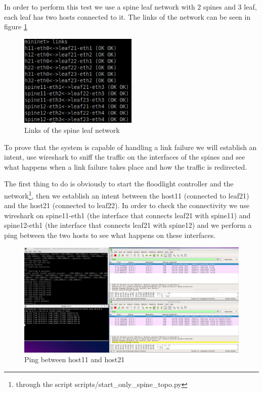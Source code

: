 \noindent In order to perform this test we use a spine leaf network with 2 spines and 3 leaf, each leaf has two hosts connected to it. The links of the network can be seen in figure \ref{img:links}

\begin{figure}[h]
	\centering
	\includegraphics[width=0.50\textwidth]{img/links.png}
	\caption{Links of the spine leaf network}
	\label{img:links}
\end{figure}

\noindent To prove that the system is capable of handling a link failure we will establish an intent, use wireshark to sniff the traffic on the interfaces of the spines and see what happens when a link failure takes place and how the traffic is redirected.

\noindent The first thing to do is obviously to start the floodlight controller and the network\footnote{through the script scripts/start\_only\_spine\_topo.py}, then we establish an intent between the host11 (connected to leaf21) and the host21 (connected to leaf22). In order to check the connectivity we use wireshark on spine11-eth1 (the interface that connects leaf21 with spine11) and spine12-eth1 (the interface that connects leaf21 with spine12) and we perform a ping between the two hosts to see what happens on these interfaces.

\begin{figure}[h]
\centering
\includegraphics[width=1\textwidth]{img/test1.png}
\caption{Ping between host11 and host21}
\label{img:ping1}
\end{figure}

